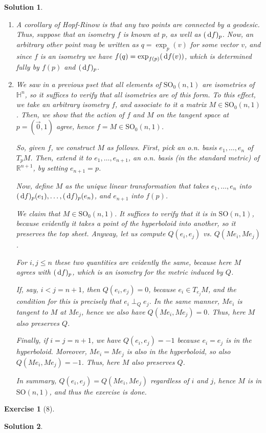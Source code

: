 \documentclass{article}
\theoremstyle{plain}
\newtheorem*{ex}{Exercise}
\theoremstyle{nonumberplain}
\newtheorem{sol}{Solution}
\newcommand{\R}{\mathbb{R}}
\newcommand{\HH}{\mathbb{H}}
\newcommand{\SO}{\mathrm{SO}}
\begin{document}
\begin{sol}
\leavevmode
\begin{enumerate}
\item A corollary of Hopf-Rinow is that any two points are connected by a geodesic. Thus, suppose that an isometry $f$ is known at $p$, as well as $(\dl f)_p$. Now, an arbitrary other point may be written as $q = \exp_p(v)$ for some vector $v$, and since $f$ is an isometry we have $f(q) = \exp_{f(p)} (\dl f(v))$, which is determined fully by $f(p)$ and $(\dl f)_p$.

\item We saw in a previous pset that all elements of $\SO_0(n,1)$ are isometries of $\HH^n$, so it suffices to verify that all isometries are of this form. To this effect, we take an arbitrary isometry $f$, and associate to it a matrix $M \in \SO_0(n,1)$. Then, we show that the action of $f$ and $M$ on the tangent space at $p = (\vec 0, 1)$ agree, hence $f = M \in \SO_0(n,1)$.

So, given $f$, we construct $M$ as follows. First, pick an o.n. basis $e_1, \dots, e_n$ of $T_pM$. Then, extend it to $e_1, \dots, e_{n+1}$, an o.n. basis (in the standard metric) of $\R^{n+1}$, by setting $e_{n+1} = p$.

Now, define $M$ as the unique linear transformation that takes $e_1, \dots, e_n$ into $(\dl f)_p(e_1), \dots, (\dl f)_p(e_n)$, and $e_{n+1}$ into $f(p)$.

We claim that $M \in \SO_0(n,1)$. It suffices to verify that it is in $\SO(n,1)$, because evidently it takes a point of the hyperboloid into another, so it preserves the top sheet. Anyway, let us compute $Q(e_i, e_j)$ vs. $Q(M e_i, M e_j)$.

For $i, j \leq n$ these two quantities are evidently the same, because here $M$ agrees with $(\dl f)_p$, which is an isometry for the metric induced by $Q$.

If, say, $i < j = n+1$, then $Q(e_i, e_j) = 0$, because $e_i \in T_{e_j} M$, and the condition for this is precisely that $e_i \perp_Q e_j$. In the same manner, $M e_i$ is tangent to $M$ at $M e_j$, hence we also have $Q(M e_i, M e_j) = 0$. Thus, here $M$ also preserves $Q$.

Finally, if $i = j = n+1$, we have $Q(e_i, e_j) = -1$ because $e_i = e_j$ is in the hyperboloid. Moreover, $M e_i = M e_j$ is also in the hyperboloid, so also $Q(M e_i, M e_j) = -1$. Thus, here $M$ also preserves $Q$.

In summary, $Q(e_i, e_j) = Q(M e_i, M e_j)$ regardless of $i$ and $j$, hence $M$ is in $\SO(n,1)$, and thus the exercise is done.
\end{enumerate}
\end{sol}

\begin{ex}[8]
\end{ex}

\begin{sol}
\end{sol}
\end{document}

